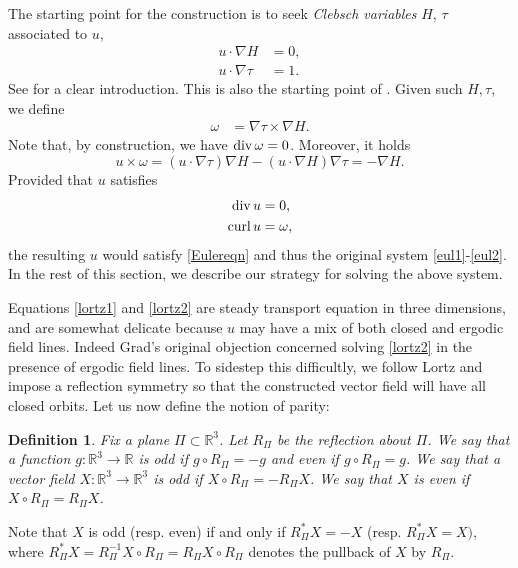 \documentclass[11pt]{article}
\theoremstyle{plain}
\numberwithin{equation}{section}
\newtheorem{defn}[thm]{Definition}
\theoremstyle{remark}
\renewcommand{\div}{{\rm div}}
\newcommand{\curl}{{\rm curl}}
\begin{document}
The starting point for the construction is to seek \emph{Clebsch variables}
$H$, $\tau$ associated to $u$,
\begin{align}
  \label{lortz1}
  u\cdot \nabla H &= 0,\\
  \label{lortz2}
  u\cdot \nabla \tau &= 1.
\end{align}
See \cite{C17} for a clear introduction. This is also the starting point of \cite{L70,W77,SK95,KS97}. Given such $H, \tau$, we define
\begin{align}
  \label{lortz3}
  \omega &= \nabla \tau \times \nabla H.
\end{align}
Note that, by construction, we have $\div\, \omega = 0$. Moreover, it holds 
\begin{equation}
  \label{}
  u \times \omega
  = (u\cdot \nabla \tau) \nabla H- (u\cdot \nabla H) \nabla \tau
  = -\nabla H.
\end{equation}
Provided that $u$ satisfies
\begin{align}
  \label{}
  \div \,u&=0,\\
  \curl \,u&= \omega,
\end{align}
the resulting $u$ would satisfy \eqref{Eulereqn} and thus the original
system \eqref{eul1}-\eqref{eul2}. In the rest of this section, we describe
our strategy for solving the above system.


Equations \eqref{lortz1} and \eqref{lortz2} are steady transport equation in three dimensions, and are somewhat delicate because $u$ may have a mix of both closed and ergodic field lines.  Indeed Grad's original objection concerned solving \eqref{lortz2} in the presence of ergodic field lines.  To sidestep this difficultly, we follow Lortz and impose a reflection symmetry so that the constructed  vector field will have all closed orbits. Let us now define the notion of parity:
\begin{defn}
    \label{baseparity}
Fix a plane $\Pi\subset \mathbb{R}^3$. Let $R_\Pi $ be the reflection about $\Pi $.  We say that a function $g:\mathbb{R}^3\to \mathbb{R}$ is odd if $g\circ R_\Pi = - g$ and even if $g\circ R_\Pi = g$.
    We say that a vector field $X:\mathbb{R}^3\to \mathbb{R}^3$ is odd   if $X\circ R_\Pi = -R_\Pi X$.
  We say that $X$ is even     if $X\circ R_\Pi = R_\Pi X$.   
\end{defn}

Note that $X$ is odd  (resp. even) if and only if $R_\Pi^*X = -X$
(resp. $R_\Pi^*X = X)$, where $R_\Pi^*X = R_\Pi^{-1} X\circ R_\Pi= R_\Pi X \circ R_\Pi$ 
denotes the pullback
of $X$ by $R_\Pi$.
\end{document}
